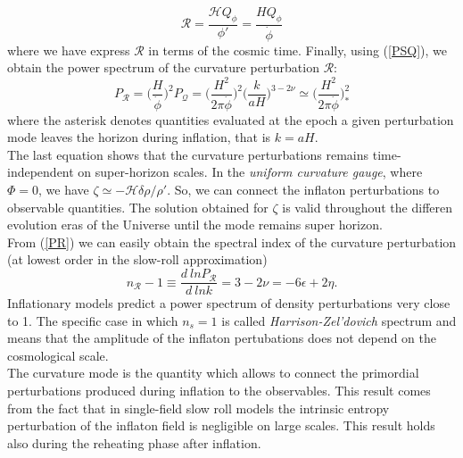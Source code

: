 \documentclass[11pt,a4paper,twoside]{book}
\begin{document}
\begin{equation}
	\label{expressionR}
	\mathcal{R}=\dfrac{\mathcal{H}Q_{\phi}}{\phi'} = \frac{H Q_{\phi}}{\dot{\phi}}
\end{equation}
where we have express $ \mathcal{R} $ in terms of the cosmic time.
Finally, using (\ref{PSQ}), we obtain the power spectrum of the curvature perturbation $\mathcal{R}$:
\begin{equation}
\label{PR}
P_{\mathcal{R}}=\Big (\frac{H}{\dot{\phi}}\Big)^{2}P_{\mathcal{Q}}= \Big (\frac{H^{2}}{2\pi \dot{\phi}}\Big)^{2}\Big(\frac{k}{aH}\Big)^{3-2\nu} \simeq \Big(\frac{H^{2}}{2\pi\dot{\phi}}\Big)^{2}_{*}
\end{equation}
where  the asterisk denotes quantities evaluated at the epoch a given perturbation mode leaves the horizon during inflation, that is $ k=aH $.\\
The last equation shows that the curvature perturbations remains  time-independent on super-horizon scales. In the \textit{uniform curvature gauge}, where $ \Phi=0 $, we have $ \zeta \simeq - \mathcal{H}\delta \rho/\rho' $. So, we can connect the inflaton perturbations to observable quantities.
The solution obtained for $\zeta$ is valid  throughout the differen evolution eras of the Universe until the mode remains super horizon.\\
From (\ref{PR}) we can easily obtain the spectral index of the curvature perturbation (at lowest order in the slow-roll approximation)
\begin{equation}
\label{spectralIndex}
n_{\mathcal{R}}-1\equiv \frac{d\ ln P_{\mathcal{R}}}{d\ ln k} = 3 - 2\nu=-6\epsilon + 2\eta.
\end{equation}
Inflationary models predict a power spectrum of density perturbations very close to 1. The specific case in which $ n_{s}=1 $ is called \textit{Harrison-Zel'dovich} spectrum and means that the amplitude of the inflaton pertubations does not depend on the cosmological scale.\\ 
The curvature mode is the quantity which allows to connect the primordial perturbations produced during inflation to the observables.
This result comes from the fact that in single-field slow roll models the intrinsic entropy perturbation of the inflaton field is negligible on large scales. This result holds also during the reheating phase after inflation\cite{NonGauss:Intro}. 
\end{document}
